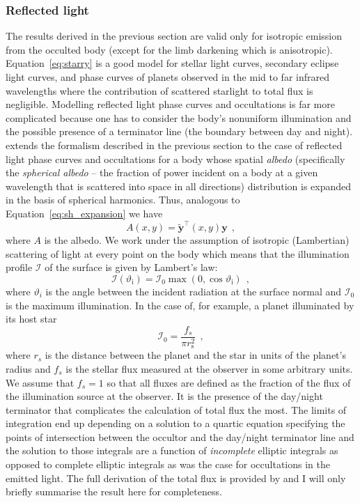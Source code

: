 \documentclass[12pt,dvipsnames]{report}
\newcommand{\hquad}{~~}
\begin{document}
\subsubsection{Reflected light}
The results derived in the previous section are valid only for isotropic emission
from the occulted body (except for the limb darkening which is anisotropic). 
Equation~\ref{eq:starry} is a good model for stellar
light curves, secondary eclipse light curves, and phase curves of planets
observed in the mid to far infrared wavelengths where the contribution of
scattered starlight to total flux is negligible. Modelling reflected light phase
curves and occultations is far more complicated because one has to consider
the body's nonuniform illumination and the possible presence
of a terminator line (the boundary between day and night).
\citet{2021arXiv210306275L} extends the formalism described in the previous
section to the case of reflected light phase curves and occultations for a body
whose spatial \emph{albedo} (specifically the \emph{spherical albedo} -- the
fraction of power incident on a body at a given wavelength that is scattered
into space in all directions) distribution is expanded in the basis of spherical
harmonics. Thus, analogous to Equation~\ref{eq:sh_expansion} we have
\begin{equation}
    A(x, y)=\tilde{\mathbf{y}}^{\intercal}(x, y) \mathbf{y}
    \hquad,
\end{equation}
where $A$ is the albedo. We work under the assumption of isotropic (Lambertian)
scattering of light at every point on the body which means that the illumination
profile $\mathcal{I}$ of the surface is given by Lambert's law:
\begin{equation}
    \mathcal{I}\left(\vartheta_{\mathrm{i}}\right)=\mathcal{I}_{0} \max \left(0, \cos \vartheta_{\mathrm{i}}\right)
    \hquad,
\end{equation}
where $\vartheta_i$ is the angle between the incident radiation at the surface normal
and $\mathcal{I}_0$ is the maximum illumination. In the case of, for example, a planet illuminated
by its host star \citep[Appendix A.2 in][]{2021arXiv210306275L}
\begin{equation}
    \mathcal{I}_{0}=\frac{f_{s}}{\pi r_{\mathrm{s}}^{2}}
    \hquad,
\end{equation}
where $r_s$ is the distance between the planet and the star in units of the planet's radius
and $f_s$ is the stellar flux measured at the observer in some arbitrary units.
We assume that $f_s=1$ so that all fluxes are defined as the fraction of the flux
of the illumination source at the observer.
It is the presence of the day/night terminator that complicates the calculation
of total flux the most. The limits of integration end up depending on a
solution to a quartic equation specifying the points of intersection between
the occultor and the day/night terminator line and the solution to those
integrals are a function of \emph{incomplete} elliptic integrals as opposed to
complete elliptic integrals as was the case for occultations in the emitted light.
The full derivation of the total flux is provided by \citet{2021arXiv210306275L} and
I will only briefly summarise  the result here for completeness.
\end{document}
